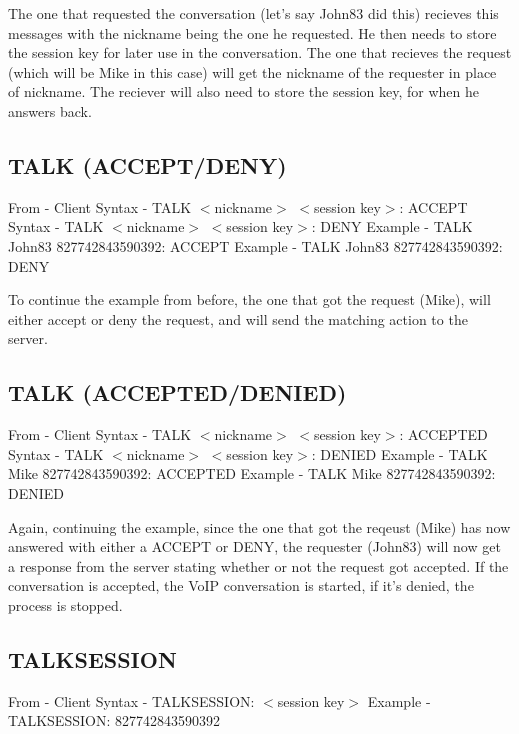 \documentclass[12pt]{rapport}
\begin{document}
\noindent The one that requested the conversation (let's say John83
did this) recieves this messages with the nickname being the one he
requested. He then needs to store the session key for later use in the
conversation.\newline
\noindent The one that recieves the request (which will be Mike in
this case) will get the nickname of the requester in place of
nickname. The reciever will also need to store the session key, for
when he answers back.

\subsection*{TALK (ACCEPT/DENY)}
From    - Client\newline
Syntax  - TALK $<$nickname$>$ $<$session key$>$: ACCEPT\newline
Syntax  - TALK $<$nickname$>$ $<$session key$>$: DENY\newline
Example - TALK John83 827742843590392: ACCEPT\newline
Example - TALK John83 827742843590392: DENY\newline

\noindent To continue the example from before, the one that got the
request (Mike), will either accept or deny the request, and will send
the matching action to the server.

\subsection*{TALK (ACCEPTED/DENIED)}
From    - Client\newline
Syntax  - TALK $<$nickname$>$ $<$session key$>$: ACCEPTED\newline
Syntax  - TALK $<$nickname$>$ $<$session key$>$: DENIED\newline
Example - TALK Mike 827742843590392: ACCEPTED\newline
Example - TALK Mike 827742843590392: DENIED\newline

\noindent Again, continuing the example, since the one that got the
reqeust (Mike) has now answered with either a ACCEPT or DENY, the
requester (John83) will now get a response from the server stating
whether or not the request got accepted. If the conversation is
accepted, the VoIP conversation is started, if it's denied, the
process is stopped.

\subsection*{TALKSESSION}
From    - Client\newline
Syntax  - TALKSESSION: $<$session key$>$\newline
Example - TALKSESSION: 827742843590392\newline
\end{document}
